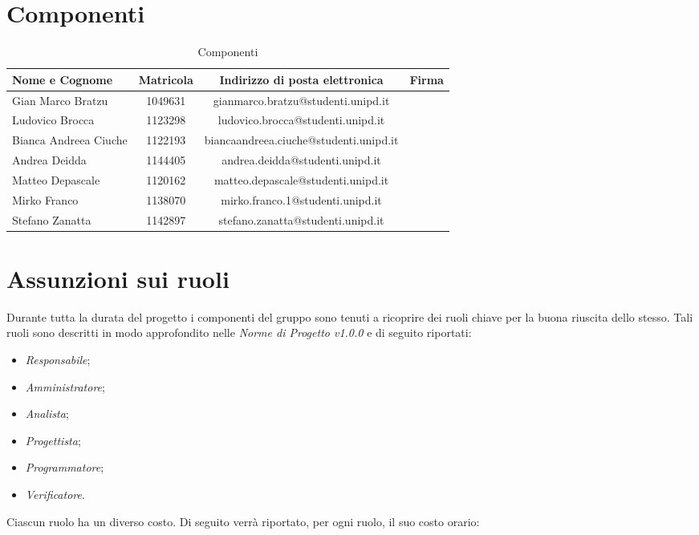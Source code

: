 \section{Componenti}

	\begin{table}[htp]
		\centering
		\caption{Componenti}
		\begin{tabularx}{\textwidth}{|X|c|c|X|}
			\hline
			\textbf{Nome e Cognome} & \textbf{Matricola} & \textbf{Indirizzo di posta elettronica} & \textbf{Firma} \\
			\hline 
			Gian Marco Bratzu & 1049631 & gianmarco.bratzu@studenti.unipd.it & \\
			\hline
			Ludovico Brocca & 1123298 & ludovico.brocca@studenti.unipd.it & \\
			\hline
			Bianca Andreea Ciuche & 1122193 & biancaandreea.ciuche@studenti.unipd.it & \\
			\hline
			Andrea Deidda & 1144405 & andrea.deidda@studenti.unipd.it & \\
			\hline
			Matteo Depascale & 1120162 & matteo.depascale@studenti.unipd.it & \\
			\hline
			Mirko Franco & 1138070 &  mirko.franco.1@studenti.unipd.it & \\
			\hline
			Stefano Zanatta & 1142897 & stefano.zanatta@studenti.unipd.it & \\
			\hline
		\end{tabularx}
	\end{table}

\section{Assunzioni sui ruoli}
	Durante tutta la durata del progetto i componenti del gruppo sono tenuti a ricoprire dei ruoli chiave per la buona riuscita dello stesso.
	Tali ruoli sono descritti in modo approfondito nelle \textit{Norme di Progetto v1.0.0} e di seguito riportati:
	\begin{itemize}
		\item \textit{Responsabile};
		\item \textit{Amministratore};
		\item \textit{Analista};
		\item \textit{Progettista};
		\item \textit{Programmatore};
		\item \textit{Verificatore}.
	\end{itemize}
	Ciascun ruolo ha un diverso costo. Di seguito verrà riportato, per ogni ruolo, il suo costo orario:
	
